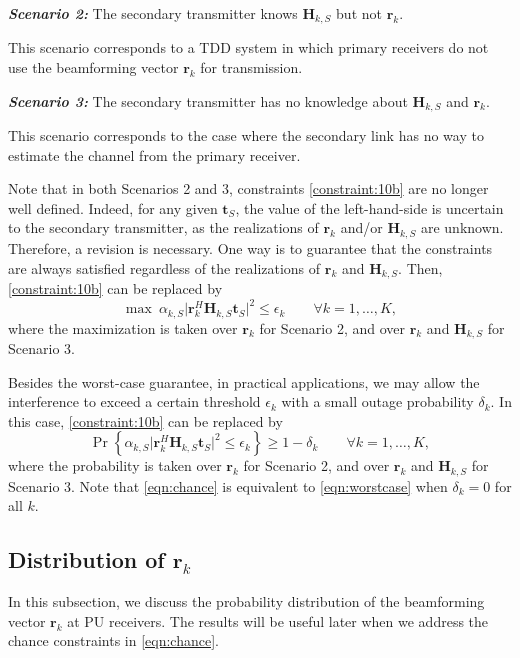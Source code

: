 \documentclass[twocolumn,10pt]{IEEEtran}
\theoremstyle{plain} \newtheorem{theorem}{Theorem}
\theoremstyle{plain} \newtheorem{proposition}{Proposition}
\theoremstyle{plain} \newtheorem{corollary}{Corollary}
\theoremstyle{remark} \newtheorem{remark}{Remark}
\theoremstyle{remark} \newtheorem{lemma}{Lemma}
\theoremstyle{plain} \newtheorem{definition}{Definition}
\theoremstyle{plain} \newtheorem{assumption}{Assumption}
\theoremstyle{plain} \newtheorem{fact}{Fact}
\begin{document}
\noindent \emph{\textbf{Scenario 2:}} The secondary transmitter knows $\mathbf{H}_{k,S}$ but not $\mathbf{r}_k$.

This scenario corresponds to a TDD system in which primary receivers do not use the beamforming vector $\mathbf{r}_k$ for transmission.

\noindent \emph{\textbf{Scenario 3:}} The secondary transmitter has no knowledge about $\mathbf{H}_{k,S}$ and $\mathbf{r}_k$.

This scenario corresponds to the case where the secondary link has no way to estimate the channel from the primary receiver.

Note that in both Scenarios 2 and 3, constraints \eqref{constraint:10b} are no longer well defined. Indeed, for any given $\mathbf{t}_S$, the value of the left-hand-side is uncertain to the secondary transmitter, as the realizations of $\mathbf{r}_k$ and/or $\mathbf{H}_{k,S}$ are unknown. Therefore, a revision is necessary. One way is to guarantee that the constraints are always satisfied regardless of the realizations of $\mathbf{r}_k$ and $\mathbf{H}_{k,S}$. Then, \eqref{constraint:10b} can be replaced by
\begin{equation}\label{eqn:worstcase}
\max ~\alpha_{k,S}\big| \mathbf{r}_k^H \mathbf{H}_{k,S}\mathbf{t}_S\big|^2 \leq \epsilon_k \qquad\forall k=1,\ldots,K,
\end{equation}
where the maximization is taken over $\mathbf{r}_k$ for Scenario 2, and over $\mathbf{r}_k$ and $\mathbf{H}_{k,S}$ for Scenario 3.

Besides the worst-case guarantee, in practical applications, we may allow the interference to exceed a certain threshold $\epsilon_k$ with a small outage probability $\delta_k$. In this case, \eqref{constraint:10b} can be replaced by
\begin{equation}\label{eqn:chance}
\Pr\left\{\alpha_{k,S}\big| \mathbf{r}_k^H \mathbf{H}_{k,S}\mathbf{t}_S\big|^2 \leq \epsilon_k\right\}\geq 1-\delta_k \qquad\forall k=1,\ldots,K,
\end{equation}
where the probability is taken over $\mathbf{r}_k$ for Scenario 2, and over $\mathbf{r}_k$ and $\mathbf{H}_{k,S}$ for Scenario 3.  Note that \eqref{eqn:chance} is equivalent to \eqref{eqn:worstcase} when $\delta_k=0$ for all $k$.

\subsection{Distribution of $\mathbf{r}_k$}
In this subsection, we discuss the probability distribution of the beamforming vector $\mathbf{r}_k$ at PU receivers. The results will be useful later when we address the chance constraints in \eqref{eqn:chance}.
\end{document}
